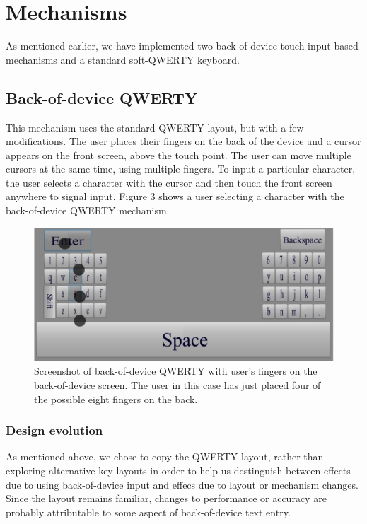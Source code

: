 \section{Mechanisms}

As mentioned earlier, we have implemented two back-of-device touch input based mechanisms and a standard soft-QWERTY keyboard. 

\subsection{Back-of-device QWERTY}

This mechanism uses the standard QWERTY layout, but with a few
modifications. The user places their fingers on the back of the device
and a cursor appears on the front screen, above the touch point.  The
user can move multiple cursors at the same time, using multiple
fingers. To input a particular character, the user selects a
character with the cursor and then touch the front screen
anywhere to signal input. Figure 3 shows a user selecting a character
with the back-of-device QWERTY mechanism.

\begin{figure}
    \includegraphics[scale=0.45]{Figures/backside.pdf} 
    \caption{Screenshot of back-of-device QWERTY with user's fingers on the back-of-device screen. The user in this case has just placed four of the possible eight fingers on the back.}
\end{figure}

\subsubsection{Design evolution}
As mentioned above, we chose to copy the QWERTY layout, rather than exploring alternative key layouts in order to help us destinguish
between effects due to using back-of-device input and effecs due to
layout or mechanism changes.  Since the layout remains familiar,
changes to performance or accuracy are probably attributable to some
aspect of back-of-device text entry.

